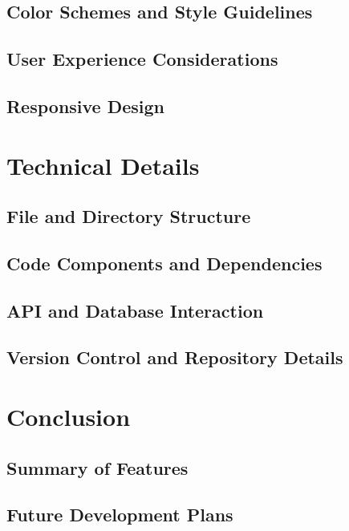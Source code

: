 \documentclass[12pt]{article}
\begin{document}
\subsection{Color Schemes and Style Guidelines}
\subsection{User Experience Considerations}
\subsection{Responsive Design}

\newpage
\section{Technical Details}
\subsection{File and Directory Structure}
\subsection{Code Components and Dependencies}
\subsection{API and Database Interaction}
\subsection{Version Control and Repository Details}

\newpage
\section{Conclusion}
\subsection{Summary of Features}
\subsection{Future Development Plans}
\end{document}
